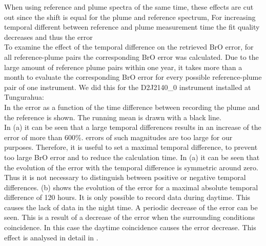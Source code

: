 When using reference and plume spectra of the same time, these effects are cut out since the shift is equal for the plume and reference spectrum, For increasing temporal different between reference and plume measurement time the fit quality decreases and thus the  error\\
To examine the effect of the temporal difference on the retrieved BrO error, for all reference-plume pairs the corresponding BrO error was calculated. Due to the large amount of reference plume pairs within one year, it takes more than a month to evaluate the corresponding BrO error for every possible reference-plume pair of one instrument. We did this for the  D2J2140\_0 instrument installed at Tungurahua:\\
In  the  error as a function of the time difference between recording the plume and the reference is shown. The running mean is drawn with a black line. \\
In  (a) it can be seen that a large temporal differences results in an increase of the   error of more than 600\%.  errors of such magnitudes are too large for our purposes. Therefore, it is useful to set a maximal temporal difference, to prevent too large BrO error and to reduce the calculation time.
%
In  (a) it can be seen that the evolution of the   error with the temporal difference is symmetric around zero. Thus it is not necessary to distinguish between positive or negative temporal differences.
%
 (b) shows the evolution of the  error for a maximal absolute temporal difference of 120 hours. It is only possible to record data during daytime. This causes the lack of data in the night time. A periodic decrease of the  error can be seen. This is a result of a decrease of the  error when the surrounding conditions coincidence. In this case the daytime coincidence causes the   error decrease. This effect is analysed in detail in .\\


